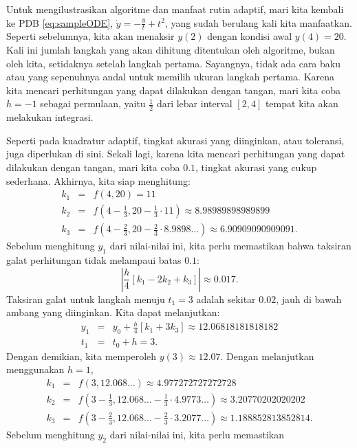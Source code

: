 Untuk mengilustrasikan algoritme dan manfaat rutin adaptif, mari kita
kembali ke PDB \ref{eq:sampleODE}, $\dot{y}=-\frac{y}{t}+t^{2}$,
yang sudah berulang kali kita manfaatkan. Seperti sebelumnya, kita
akan menaksir $y(2)$ dengan kondisi awal $y(4)=20$. Kali ini jumlah
langkah yang akan dihitung ditentukan oleh algoritme, bukan oleh kita,
setidaknya setelah langkah pertama. Sayangnya, tidak ada cara baku
atau yang sepenuhnya andal untuk memilih ukuran langkah pertama. Karena
kita mencari perhitungan yang dapat dilakukan dengan tangan, mari
kita coba $h=-1$ sebagai permulaan, yaitu $\frac{1}{2}$ dari lebar
interval $[2,4]$ tempat kita akan melakukan integrasi. 

Seperti pada kuadratur adaptif, tingkat akurasi yang diinginkan, atau
toleransi, juga diperlukan di sini. Sekali lagi, karena kita mencari
perhitungan yang dapat dilakukan dengan tangan, mari kita coba $0.1$,
tingkat akurasi yang cukup sederhana. Akhirnya, kita siap menghitung:
\begin{eqnarray*}
k_{1} & = & f(4,20)=11\\
k_{2} & = & f\left(4-\frac{1}{3},20-\frac{1}{3}\cdot11\right)\approx8.98989898989899\\
k_{3} & = & f\left(4-\frac{2}{3},20-\frac{2}{3}\cdot8.9898\ldots\right)\approx6.90909090909091.
\end{eqnarray*}
Sebelum menghitung $y_{1}$ dari nilai-nilai ini, kita perlu memastikan
bahwa taksiran galat perhitungan tidak melampaui batas $0.1$:
\[
\left|\frac{h}{4}\left[k_{1}-2k_{2}+k_{3}\right]\right|\approx0.017.
\]
Taksiran galat untuk langkah menuju $t_{1}=3$ adalah sekitar $0.02$,
jauh di bawah ambang yang diinginkan. Kita dapat melanjutkan:
\begin{eqnarray*}
y_{1} & = & y_{0}+\frac{h}{4}\left[k_{1}+3k_{3}\right]\approx12.06818181818182\\
t_{1} & = & t_{0}+h=3.
\end{eqnarray*}
Dengan demikian, kita memperoleh $y(3)\approx12.07$. Dengan melanjutkan
menggunakan $h=1$,
\begin{eqnarray*}
k_{1} & = & f(3,12.068\ldots)\approx4.977272727272728\\
k_{2} & = & f\left(3-\frac{1}{3},12.068\ldots-\frac{1}{3}\cdot4.9773\ldots\right)\approx3.20770202020202\\
k_{3} & = & f\left(3-\frac{2}{3},12.068\ldots-\frac{2}{3}\cdot3.2077\ldots\right)\approx1.188852813852814.
\end{eqnarray*}
Sebelum menghitung $y_{2}$ dari nilai-nilai ini, kita perlu memastikan
